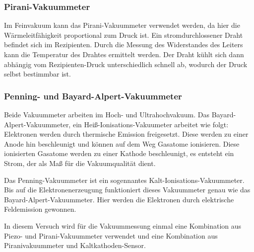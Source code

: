        \subsubsection{Pirani-Vakuummeter}
            Im Feinvakuum kann das Pirani-Vakuummeter verwendet werden, da hier die Wärmeleitfähigkeit proportional zum Druck ist.
            Ein stromdurchlossener Draht befindet sich im Rezipienten.
            Durch die Messung des Widerstandes des Leiters kann die Temperatur des Drahtes ermittelt werden.
            Der Draht kühlt sich dann abhängig vom Rezipienten-Druck unterschiedlich schnell ab, wodurch der Druck selbst bestimmbar ist.

        \subsubsection{Penning- und Bayard-Alpert-Vakuummeter}
            Beide Vakuummeter arbeiten im Hoch- und Ultrahochvakuum.
            Das Bayard-Alpert-Vakuummeter, ein Heiß-Ionisations-Vakuumeter arbeitet wie folgt:\\
            Elektronen werden durch thermische Emission freigesetzt.
            Diese werden zu einer Anode hin beschleunigt und können auf dem Weg Gasatome ionisieren.
            Diese ionisierten Gasatome werden zu einer Kathode beschleunigt, es entsteht ein Strom, der als Maß für die Vakuumqualität dient.
        
            \noindent
            Das Penning-Vakuummeter ist ein sogennantes Kalt-Ionisations-Vakuummeter.
            Bis auf die Elektronenerzeugung funktioniert dieses Vakuummeter genau wie das Bayard-Alpert-Vakuummeter.
            Hier werden die Elektronen durch elektrische Feldemission gewonnen.

        \noindent
        In diesem Versuch wird für die Vakuummessung einmal eine Kombination aus Piezo- und Pirani-Vakuummeter verwendet und eine Kombination aus Piranivakuummeter und Kaltkathoden-Sensor.
